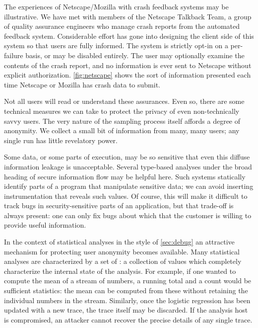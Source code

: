 The experiences of Netscape/Mozilla with crash feedback systems may be
illustrative.  We have met with members of the Netscape Talkback Team,
a group of quality assurance engineers who
manage crash reports from the automated feedback system.
Considerable effort has gone into designing the client side of this
system so that users are fully informed.  The system is strictly
opt-in on a per-failure basis, or may be disabled entirely.  The user
may optionally examine the contents of the crash report, and no
information is ever sent to Netscape without explicit authorization.
\autoref{fig:netscape} shows the sort of information
presented each time Netscape or Mozilla has crash data to submit.

Not all users will read or understand these assurances.
%
Even so, there are some technical measures we can take to protect the
privacy of even non-technically savvy users.  The very nature of the
sampling process itself affords a degree of anonymity.  We collect a
small bit of information from many, many users; any single run has
little revelatory power.

Some data, or some parts of execution, may be so sensitive that even
this diffuse information leakage is unacceptable.  Several type-based
analyses under the broad heading of secure information flow
\cite{volpano96:sound,1997:tapsoft:volpano,ZdZhNyMy2001} may be
helpful here.  Such systems statically identify parts of a
program that manipulate sensitive data; we can avoid
inserting instrumentation that reveals such values.  Of course, this
will make it difficult to track bugs in security-sensitive parts
of an application, but that trade-off is always present: one can only
fix bugs about which that the customer is willing to provide useful
information.  

In the context of statistical analyses in the style of
\autoref{sec:debug} an attractive mechanism for protecting user
anonymity becomes available.  Many statistical analyses are
characterized by a set of : a
collection of values which completely characterize the internal state
of the analysis.  For example, if one wanted to compute the mean of a
stream of numbers, a running total and a count would be sufficient
statistics: the mean can be computed from these without retaining the
individual numbers in the stream.  Similarly, once the logistic
regression has been updated with a new trace, the trace itself may be
discarded.  If the analysis host is compromised, an attacker cannot
recover the precise details of any single trace.

